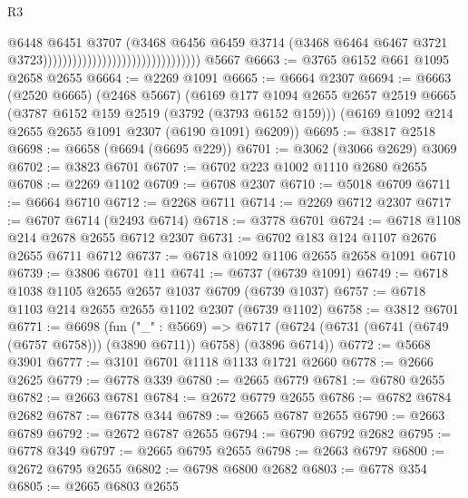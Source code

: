 \begin{lexlean}{R3}
\begin{coremodule}
                                                                @6448
                                                                @6451
                                                                @3707
                                                                (@3468
                                                                  @6456
                                                                  @6459
                                                                  @3714
                                                                  (@3468
                                                                    @6464
                                                                    @6467
                                                                    @3721
                                                                    @3723))))))))))))))))))))))))))))))))
    @5667
@6663 := @3765 @6152 @661 @1095 @2658 @2655
@6664 := @2269 @1091
@6665 := @6664 @2307
@6694 := @6663
    (@2520 @6665)
    (@2468 @5667)
    (@6169
      @177
      @1094
      @2655
      @2657
      @2519
      @6665
      (@3787 @6152 @159 @2519 (@3792 (@3793 @6152 @159)))
      (@6169 @1092 @214 @2655 @2655 @1091 @2307 (@6190 @1091) @6209))
@6695 := @3817 @2518
@6698 := @6658 (@6694 (@6695 @229))
@6701 := @3062 (@3066 @2629) @3069
@6702 := @3823 @6701
@6707 := @6702 @223 @1002 @1110 @2680 @2655
@6708 := @2269 @1102
@6709 := @6708 @2307
@6710 := @5018 @6709
@6711 := @6664 @6710
@6712 := @2268 @6711
@6714 := @2269 @6712 @2307
@6717 := @6707 @6714 (@2493 @6714)
@6718 := @3778 @6701
@6724 := @6718 @1108 @214 @2678 @2655 @6712 @2307
@6731 := @6702 @183 @124 @1107 @2676 @2655 @6711 @6712
@6737 := @6718 @1092 @1106 @2655 @2658 @1091 @6710
@6739 := @3806 @6701 @11
@6741 := @6737 (@6739 @1091)
@6749 := @6718 @1038 @1105 @2655 @2657 @1037 @6709 (@6739 @1037)
@6757 := @6718 @1103 @214 @2655 @2655 @1102 @2307 (@6739 @1102)
@6758 := @3812 @6701
@6771 := @6698
    (fun ("_" : @5669) =>
    @6717 (@6724 (@6731 (@6741 (@6749 (@6757 @6758))) (@3890 @6711)) @6758) (@3896 @6714))
@6772 := @5668 @3901
@6777 := @3101 @6701 @1118 @1133 @1721 @2660
@6778 := @2666 @2625
@6779 := @6778 @339
@6780 := @2665 @6779
@6781 := @6780 @2655
@6782 := @2663 @6781
@6784 := @2672 @6779 @2655
@6786 := @6782 @6784 @2682
@6787 := @6778 @344
@6789 := @2665 @6787 @2655
@6790 := @2663 @6789
@6792 := @2672 @6787 @2655
@6794 := @6790 @6792 @2682
@6795 := @6778 @349
@6797 := @2665 @6795 @2655
@6798 := @2663 @6797
@6800 := @2672 @6795 @2655
@6802 := @6798 @6800 @2682
@6803 := @6778 @354
@6805 := @2665 @6803 @2655

\end{coremodule}
\end{lexlean}
